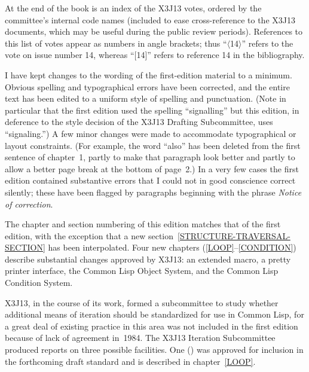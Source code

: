 At the end of the book is an index of the X3J13 votes, ordered
by the committee's internal code names (included to ease cross-reference
to the X3J13 documents, which may be useful during the public review
periods).  References to this list of votes appear as numbers
in angle brackets; thus
``$\langle$14$\rangle$'' refers to the vote on issue number 14, whereas
``[14]'' refers to reference 14 in the bibliography.

I have kept changes to the wording of the first-edition material to a minimum.
Obvious spelling and typographical errors have been corrected,
and the entire text has been edited to a uniform style of
spelling and punctuation.  (Note in particular that the first edition
used the spelling ``signalling'' but this edition,
in deference to the style decision of the X3J13 Drafting
Subcommittee, uses ``signaling.'')  A few minor
changes were made to accommodate typographical or layout constraints.
(For example, the word ``also'' has been deleted from the first
sentence of chapter~1, partly to make that paragraph look better
and partly to allow a better page break at the bottom of page~2.)
In a very few cases the first edition contained substantive errors
that I could not in good conscience correct silently; these have
been flagged by paragraphs beginning with the phrase
{\it Notice of correction}.

The chapter and section numbering of this edition matches that
of the first edition, with the exception that a new
section~\ref{STRUCTURE-TRAVERSAL-SECTION}
has been interpolated.
Four new chapters (\ref{LOOP}--\ref{CONDITION})
describe substantial changes approved by X3J13: an extended
 macro, a pretty printer interface, the Common Lisp
Object System, and the Common Lisp Condition System.

X3J13, in the course of its work, formed a subcommittee to study
whether additional means of iteration
should be standardized for use in Common Lisp, for a great
deal of existing practice in this area was not included in the
first edition because of lack of agreement in~1984.
The X3J13 Iteration Subcommittee produced reports on three possible facilities.
One () was approved for inclusion in the forthcoming draft standard
and is described in chapter~\ref{LOOP}.


